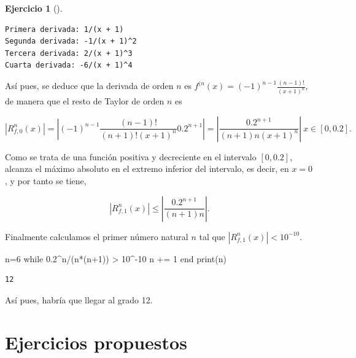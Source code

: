 \documentclass[
  a4paper,
]{scrreport}
\newenvironment{Shaded}{\begin{snugshade}}{\end{snugshade}}
\newcommand{\ControlFlowTok}[1]{\textcolor[rgb]{0.00,0.23,0.31}{#1}}
\newcommand{\FloatTok}[1]{\textcolor[rgb]{0.68,0.00,0.00}{#1}}
\newcommand{\FunctionTok}[1]{\textcolor[rgb]{0.28,0.35,0.67}{#1}}
\newcommand{\NormalTok}[1]{\textcolor[rgb]{0.00,0.23,0.31}{#1}}
\newcommand{\OperatorTok}[1]{\textcolor[rgb]{0.37,0.37,0.37}{#1}}
\theoremstyle{definition}
\newtheorem{exercise}{Ejercicio}[chapter]
\theoremstyle{remark}
\begin{document}
\begin{exercise}[]
\begin{tcolorbox}
\begin{verbatim}
Primera derivada: 1/(x + 1)
Segunda derivada: -1/(x + 1)^2
Tercera derivada: 2/(x + 1)^3
Cuarta derivada: -6/(x + 1)^4
\end{verbatim}

Así pues, se deduce que la derivada de orden \(n\) es
\(f^{(n}(x)=(-1)^{n-1}\frac{(n-1)!}{(x+1)^n}\), de manera que el resto
de Taylor de orden \(n\) es

\[
|R^n_{f,0}(x)| =\left|(-1)^{n-1}\frac{(n-1)!}{(n+1)!(x+1)^n}0.2^{n+1}\right| = \left|\frac{0.2^{n+1}}{(n+1)n(x+1)^n}\right|\ x\in [0,0.2].
\]

Como se trata de una función positiva y decreciente en el intervalo
\([0,0.2]\), alcanza el máximo absoluto en el extremo inferior del
intervalo, es decir, en \(x=0\), y por tanto se tiene,

\[
|R^n_{f,1}(x)| \leq \left|\frac{0.2^{n+1}}{(n+1)n}\right|.
\]

Finalmente calculamos el primer número natural \(n\) tal que
\(|R^n_{f,1}(x)|<10^{-10}\).

\begin{Shaded}
\begin{Highlighting}[]
\NormalTok{n}\OperatorTok{=}\FloatTok{6}
\ControlFlowTok{while} \FloatTok{0.2}\OperatorTok{\^{}}\NormalTok{n}\OperatorTok{/}\NormalTok{(}\FunctionTok{n*}\NormalTok{(n}\OperatorTok{+}\FloatTok{1}\NormalTok{)) }\OperatorTok{\textgreater{}} \FloatTok{10}\OperatorTok{\^{}{-}}\FloatTok{10}
\NormalTok{    n }\OperatorTok{+=} \FloatTok{1}
\ControlFlowTok{end}
\FunctionTok{print}\NormalTok{(n)}
\end{Highlighting}
\end{Shaded}

\begin{verbatim}
12
\end{verbatim}

Así pues, habría que llegar al grado 12.

\end{tcolorbox}

\end{exercise}

\hypertarget{ejercicios-propuestos-3}{%
\section{Ejercicios propuestos}\label{ejercicios-propuestos-3}}
\end{document}
